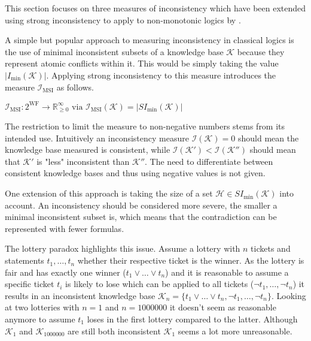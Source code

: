 This section focuses on three measures of inconsistency which have been extended using strong inconsistency to apply to non-monotonic logics by \cite{ulbricht_handling_2020}.

A simple but popular approach to measuring inconsistency in classical logics is the use of minimal inconsistent subsets of a knowledge base \(\mathcal{K}\) because they represent atomic conflicts within it. This would be simply taking the value \(\left| I_{\min}(\mathcal{K}) \right|\). Applying strong inconsistency to this measure introduces the measure \(\mathcal{I}_{\text{MSI}}\) as follows.

\begin{definition}
    \(\mathcal{I}_{\text{MSI}}: 2^{\text{WF}} \rightarrow \mathbb{R}_{\geq 0}^{\infty} \text{ via } \mathcal{I}_{\text{MSI}}(\mathcal{K}) = \left| SI_{\min}(\mathcal{K}) \right|\)
\end{definition}

The restriction to limit the measure to non-negative numbers stems from its intended use. Intuitively an inconsistency measure \(\mathcal{I}(\mathcal{K}) = 0\) should mean the knowledge base measured is consistent, while \(\mathcal{I}(\mathcal{K}') < \mathcal{I}(\mathcal{K}'')\) should mean that \(\mathcal{K}'\) is "less" inconsistent than \(\mathcal{K}''\). The need to differentiate between consistent knowledge bases and thus using negative values is not given.

One extension of this approach is taking the size of a set \(\mathcal{H} \in SI_{\min}(\mathcal{K})\) into account. An inconsistency should be considered more severe, the smaller a minimal inconsistent subset is, which means that the contradiction can be represented with fewer formulas.

The lottery paradox \cite{kyburg_probability_1961} highlights this issue.
Assume a lottery with \(n\) tickets and statements \(t_1, \dots, t_n\) whether their respective ticket is the winner. As the lottery is fair and has exactly one winner (\(t_1 \lor \dots \lor t_n\)) and it is reasonable to assume a specific ticket \(t_i\) is likely to lose which can be applied to all tickets (\(\neg t_1, \dots, \neg t_n\)) it results in an inconsistent knowledge base \(\mathcal{K}_n = \{ t_1 \lor \dots \lor t_n, \neg t_1, \dots, \neg t_n \}\). Looking at two lotteries with \(n = 1\) and \(n = 1000000\) it doesn't seem as reasonable anymore to assume \(t_1\) loses in the first lottery compared to the latter. Although \(\mathcal{K}_1\) and \(\mathcal{K}_{1000000}\) are still both inconsistent \(\mathcal{K}_1\) seems a lot more unreasonable.

